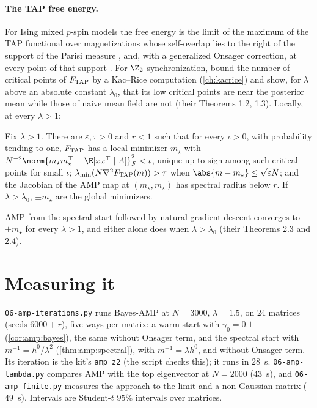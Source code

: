 \begin{refsection}
\paragraph{The TAP free energy.} For Ising mixed $p$-spin models the free energy is the limit of the maximum of the TAP functional over magnetizations whose self-overlap lies to the right of the support of the Parisi measure \parencite[Thm.~1]{ChenPanchenko2018}, and, with a generalized Onsager correction, at every point of that support \parencite{ChenPanchenkoSubag2023}. For $\Z_2$ synchronization, \textcite{FanMeiMontanari2021} bound the number of critical points of $F_{\mathrm{TAP}}$ by a Kac--Rice computation (\cref{ch:kacrice}) and show, for $\lambda$ above an absolute constant $\lambda_0$, that its low critical points are near the posterior mean while those of naive mean field are not (their Theorems 1.2, 1.3). Locally, at every $\lambda>1$:

\begin{theorem}\label{thm:amp:cfm}
Fix $\lambda>1$. There are $\varepsilon,\tau>0$ and $r<1$ such that for every $\iota>0$, with probability tending to one, $F_{\mathrm{TAP}}$ has a local minimizer $m_\star$ with $N^{-2}\norm{m_\star m_\star^\top-\E[xx^\top\mid A]}_F^2<\iota$, unique up to sign among such critical points for small $\iota$; $\lambda_{\min}(N\nabla^2F_{\mathrm{TAP}}(m))>\tau$ when $\abs{m-m_\star}\le\sqrt{\varepsilon N}$; and the Jacobian of the AMP map at $(m_\star,m_\star)$ has spectral radius below $r$. If $\lambda>\lambda_0$, $\pm m_\star$ are the global minimizers.
\end{theorem}

AMP from the spectral start followed by natural gradient descent converges to $\pm m_\star$ for every $\lambda>1$, and either alone does when $\lambda>\lambda_0$ (their Theorems 2.3 and 2.4).

\section{Measuring it}\label{sec:amp:measure}

\texttt{06-amp-iterations.py} runs Bayes-AMP at $N=3000$, $\lambda=1.5$, on $24$ matrices (seeds $6000+r$), five ways per matrix: a warm start with $\gamma_0=0.1$ (\cref{cor:amp:bayes}), the same without Onsager term, and the spectral start with $m^{-1}=h^0/\lambda^2$ (\cref{thm:amp:spectral}), with $m^{-1}=\lambda h^0$, and without Onsager term. Its iteration is the kit's \texttt{amp\_z2} (the script checks this); it runs in $28$~s. \texttt{06-amp-lambda.py} compares AMP with the top eigenvector at $N=2000$ ($43$~s), and \texttt{06-amp-finite.py} measures the approach to the limit and a non-Gaussian matrix ($49$~s). Intervals are Student-$t$ $95\%$ intervals over matrices.


\end{refsection}
